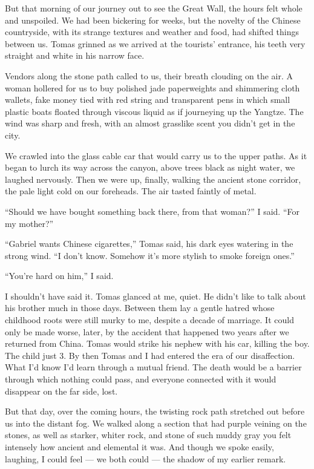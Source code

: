 But that morning of our journey out to see the Great Wall, the hours
felt whole and unspoiled. We had been bickering for weeks, but the
novelty of the Chinese countryside, with its strange textures and
weather and food, had shifted things between us. Tomas grinned as we
arrived at the tourists' entrance, his teeth very straight and white in
his narrow face.

Vendors along the stone path called to us, their breath clouding on the
air. A woman hollered for us to buy polished jade paperweights and
shimmering cloth wallets, fake money tied with red string and
transparent pens in which small plastic boats floated through viscous
liquid as if journeying up the Yangtze. The wind was sharp and fresh,
with an almost grasslike scent you didn't get in the city.

We crawled into the glass cable car that would carry us to the upper
paths. As it began to lurch its way across the canyon, above trees black
as night water, we laughed nervously. Then we were up, finally, walking
the ancient stone corridor, the pale light cold on our foreheads. The
air tasted faintly of metal.

``Should we have bought something back there, from that woman?'' I said.
``For my mother?''

``Gabriel wants Chinese cigarettes,'' Tomas said, his dark eyes watering
in the strong wind. ``I don't know. Somehow it's more stylish to smoke
foreign ones.''

``You're hard on him,'' I said.

I shouldn't have said it. Tomas glanced at me, quiet. He didn't like to
talk about his brother much in those days. Between them lay a gentle
hatred whose childhood roots were still murky to me, despite a decade of
marriage. It could only be made worse, later, by the accident that
happened two years after we returned from China. Tomas would strike his
nephew with his car, killing the boy. The child just 3. By then Tomas
and I had entered the era of our disaffection. What I'd know I'd learn
through a mutual friend. The death would be a barrier through which
nothing could pass, and everyone connected with it would disappear on
the far side, lost.

But that day, over the coming hours, the twisting rock path stretched
out before us into the distant fog. We walked along a section that had
purple veining on the stones, as well as starker, whiter rock, and stone
of such muddy gray you felt intensely how ancient and elemental it was.
And though we spoke easily, laughing, I could feel --- we both could ---
the shadow of my earlier remark.

